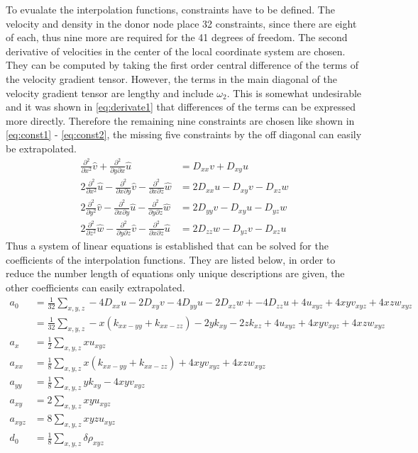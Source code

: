 To evualate the interpolation functions, constraints have to be defined. The velocity and density in the donor node place 32 constraints, since there are eight of each, thus nine more are required for the 41 degrees of freedom. The second derivative of velocities in the center of the local coordinate system are chosen. They can be computed by taking the first order central difference of the terms of the velocity gradient tensor. However, the terms in the main diagonal of the velocity gradient tensor are lengthy and include $\omega_2$. This is somewhat undesirable and it was shown in \eqref{eq:derivate1} that differences of the terms can be expressed more directly. Therefore the remaining nine constraints are chosen like shown in \eqref{eq:const1} - \eqref{eq:const2}, the missing five constraints by the off diagonal can easily be extrapolated.
\begin{align}
	\frac{\partial^2}{\partial x^2} \hat{v}+\frac{\partial^2}{\partial y \partial x} \hat{u} &= D_{xx} v + D_{xy} u \label{eq:const1} \\
	2\frac{\partial^2}{\partial x^2} \hat{u} - \frac{\partial^2}{\partial x \partial y} \hat{v} - \frac{\partial^2}{\partial x \partial z} \hat{w} &= 2 D_{xx}u- D_{xy}v - D_{xz}w \\
	2\frac{\partial^2}{\partial y^2} \hat{v} - \frac{\partial^2}{\partial x \partial y} \hat{u} - \frac{\partial^2}{\partial y \partial z} \hat{w} &= 2 D_{yy}v- D_{xy}u - D_{yz}w \\
	2\frac{\partial^2}{\partial z^2} \hat{w} - \frac{\partial^2}{\partial y \partial z} \hat{v} - \frac{\partial^2}{\partial x \partial z} \hat{u} &= 2 D_{zz}w- D_{yz}v - D_{xz}u \label{eq:const2}
\end{align}
Thus a system of linear equations is established that can be solved for the coefficients of the interpolation functions. They are listed below, in order to reduce the number length of equations only unique descriptions are given, the other coefficients can easily extrapolated. 
\begin{align}
	a_0 &= \frac{1}{32} \sum_{x,y,z}  -4 D_{xx}u-2 D_{xy}v -4D_{yy}u- 2 D_{xz}w + -4 D_{zz}u + 4 u_{xyz} + 4xyv_{xyz} + 4 xzw_{xyz} \\
	&= \frac{1}{32} \sum_{x,y,z}  -x\left(k_{xx-yy} + k_{xx-zz}\right) - 2yk_{xy} -2zk_{xz} + 4 u_{xyz} + 4xyv_{xyz} + 4 xzw_{xyz} \\
	a_x &= \frac{1}{2} \sum_{x,y,z} x u_{xyz} \\
	a_{xx} &= \frac{1}{8} \sum_{x,y,z}x\left(k_{xx-yy}+k_{xx-zz}\right) + 4xyv_{xyz}+ 4 xzw_{xyz} \\
	a_{yy} &= \frac{1}{8} \sum_{x,y,z}y k_{xy} - 4 xy v_{xyz} \\
	a_{xy} &= 2 \sum_{x,y,z} xyu_{xyz} \\
	a_{xyz} &= 8 \sum_{x,y,z} xyzu_{xyz} \\
	d_0 &= \frac{1}{8} \sum_{x,y,z} \delta \rho_{xyz} 
\end{align}
